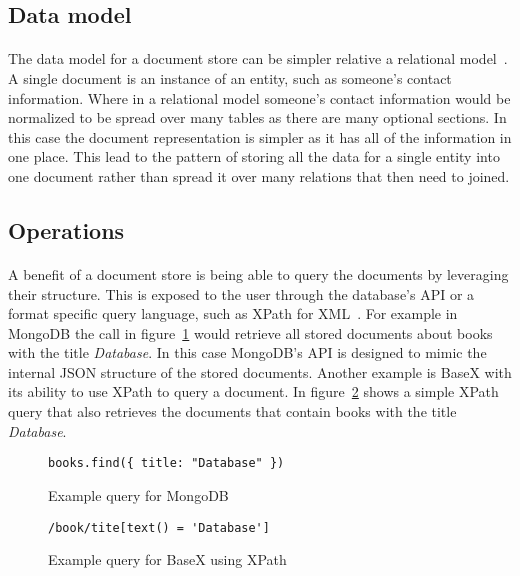 \documentclass{CRPITStyle}
\renewcommand{\cite}{\citep}
\begin{document}
\subsection{Data model}

\paragraph{}
The data model for a document store can be simpler relative a relational
model~\cite{nosql_survey}.
A single document is an instance of an entity, such as someone's contact information.
Where in a relational model someone's contact information would be
normalized to be spread over many tables as there are many optional
sections.
In this case the document representation is simpler as it has all of the
information in one place.
This lead to the pattern of storing all the data for a single entity into
one document rather than spread it over many relations that then need to
joined.

\subsection{Operations}

\paragraph{}
A benefit of a document store is being able to query the documents
by leveraging their structure.
This is exposed to the user through the database's API or a format specific
query language, such as XPath for XML~\cite{xpath}.
For example in MongoDB the call in figure~\ref{lst:mongo} would retrieve all
stored documents about books with the title \textit{Database}.
In this case MongoDB's API is designed to mimic the internal JSON structure 
of the stored documents.
Another example is BaseX with its ability to use XPath to query a document.
In figure~\ref{lst:basex} shows a simple XPath query that also retrieves
the documents that contain books with the title \textit{Database}.

\begin{figure}
\begin{verbatim}
books.find({ title: "Database" })
\end{verbatim}
\caption{Example query for MongoDB}
\label{lst:mongo}
\end{figure}

\begin{figure}
\begin{verbatim}
/book/tite[text() = 'Database']
\end{verbatim}
\caption{Example query for BaseX using XPath}
\label{lst:basex}
\end{figure}
\end{document}
